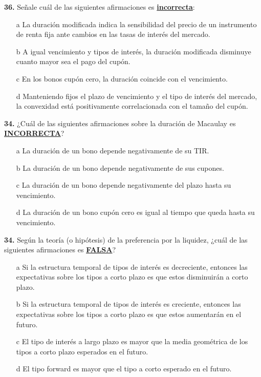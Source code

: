 \documentclass{nuevotema}
\begin{document}
\preguntas


\textbf{36.} Señale cuál de las siguientes afirmaciones es \textbf{\underline{incorrecta}}:

\begin{itemize}
	\item[a] La duración modificada indica la sensibilidad del precio de un instrumento de renta fija ante cambios en las tasas de interés del mercado.
	\item[b] A igual vencimiento y tipos de interés, la duración modificada disminuye cuanto mayor sea el pago del cupón.
	\item[c] En los bonos cupón cero, la duración coincide con el vencimiento.
	\item[d] Manteniendo fijos el plazo de vencimiento y el tipo de interés del mercado, la convexidad está positivamente correlacionada con el tamaño del cupón.
\end{itemize}


\textbf{34.} ¿Cuál de las siguientes afirmaciones sobre la duración de Macaulay es \textbf{\underline{INCORRECTA}}?

\begin{itemize}
	\item[a] La duración de un bono depende negativamente de su TIR.
	\item[b] La duración de un bono depende negativamente de sus cupones.
	\item[c] La duración de un bono depende negativamente del plazo hasta su vencimiento.
	\item[d] La duración de un bono cupón cero es igual al tiempo que queda hasta su vencimiento.
\end{itemize}


\textbf{34.} Según la teoría (o hipótesis) de la preferencia por la liquidez, ¿cuál de las siguientes afirmaciones es \underline{\textbf{FALSA}}?

\begin{itemize}
	\item[a] Si la estructura temporal de tipos de interés es decreciente, entonces las expectativas sobre los tipos a corto plazo es que estos disminuirán a corto plazo.
	\item[b] Si la estructura temporal de tipos de interés es creciente, entonces las expectativas sobre los tipos a corto plazo es que estos aumentarán en el futuro.
	\item[c] El tipo de interés a largo plazo es mayor que la media geométrica de los tipos a corto plazo esperados en el futuro. 
	\item[d] El tipo forward es mayor que el tipo a corto esperado en el futuro.
\end{itemize}
\end{document}
